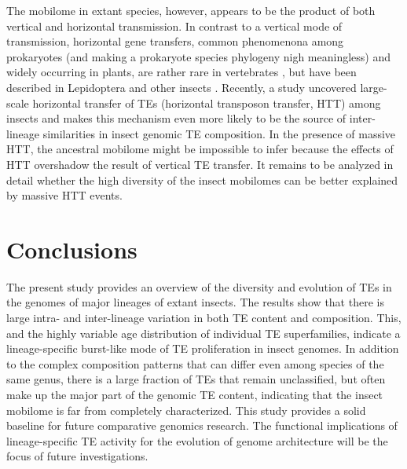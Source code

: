 The mobilome in extant species, however, appears to be the product of
both vertical and horizontal transmission. In contrast to a vertical
mode of transmission, horizontal gene transfers, common phenomenona
among prokaryotes (and making a prokaryote species phylogeny nigh
meaningless) and widely occurring in plants, are rather rare in
vertebrates \citep{Syvanen2012,Wallau2012}, but have been described in Lepidoptera
\citep{Sormacheva2012} and other insects \citep{Nakabachi2015}. Recently, a
study uncovered large-scale horizontal transfer of TEs (horizontal
transposon transfer, HTT) among insects \citep{Peccoud2017} and makes
this mechanism even more likely to be the source of inter-lineage
similarities in insect genomic TE composition. In the presence of
massive HTT, the ancestral mobilome might be impossible to infer because
the effects of HTT overshadow the result of vertical TE transfer. It
remains to be analyzed in detail whether the high diversity of the
insect mobilomes can be better explained by massive HTT events.

\section{Conclusions}

The present study provides an overview of the diversity and evolution of TEs in the genomes of major lineages of extant insects.
The results show that there is large intra- and inter-lineage variation in both TE content and composition.
This, and the highly variable age distribution of individual TE superfamilies, indicate a lineage-specific burst-like mode of TE proliferation in insect genomes.
In addition to the complex composition patterns that can differ even among species of the same genus, there is a large fraction of TEs that remain unclassified, but often make up the major part of the genomic TE content, indicating that the insect mobilome is far from completely characterized.
This study provides a solid baseline for future comparative genomics research.
The functional implications of lineage-specific TE activity for the evolution of genome architecture will be the focus of future investigations.

